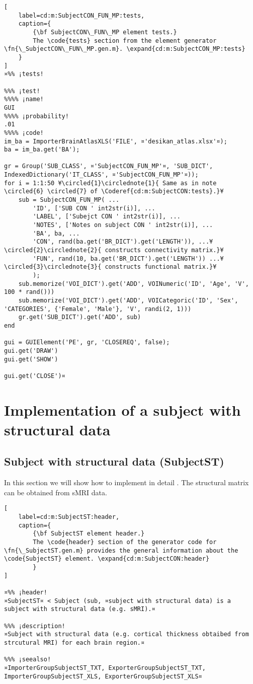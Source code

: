 \documentclass{tufte-handout}
\begin{document}
\begin{lstlisting}[
	label=cd:m:SubjectCON_FUN_MP:tests,
	caption={
		{\bf SubjectCON\_FUN\_MP element tests.}
		The \code{tests} section from the element generator \fn{\_SubjectCON\_FUN\_MP.gen.m}. \expand{cd:m:SubjectCON_MP:tests}
	}
]
¤%% ¡tests!

%%% ¡test!
%%%% ¡name!
GUI
%%%% ¡probability!
.01
%%%% ¡code!
im_ba = ImporterBrainAtlasXLS('FILE', ¤'desikan_atlas.xlsx'¤);
ba = im_ba.get('BA');

gr = Group('SUB_CLASS', ¤'SubjectCON_FUN_MP'¤, 'SUB_DICT', IndexedDictionary('IT_CLASS', ¤'SubjectCON_FUN_MP'¤));
for i = 1:1:50 ¥\circled{1}\circlednote{1}{ Same as in note \circled{6} \circled{7} of \Coderef{cd:m:SubjectCON:tests}.}¥
    sub = SubjectCON_FUN_MP( ...
        'ID', ['SUB CON ' int2str(i)], ...
        'LABEL', ['Subejct CON ' int2str(i)], ...
        'NOTES', ['Notes on subject CON ' int2str(i)], ...
        'BA', ba, ...
        'CON', rand(ba.get('BR_DICT').get('LENGTH')), ...¥\circled{2}\circlednote{2}{ constructs connectivity matrix.}¥
        'FUN', rand(10, ba.get('BR_DICT').get('LENGTH')) ...¥\circled{3}\circlednote{3}{ constructs functional matrix.}¥
        );
    sub.memorize('VOI_DICT').get('ADD', VOINumeric('ID', 'Age', 'V', 100 * rand()))
    sub.memorize('VOI_DICT').get('ADD', VOICategoric('ID', 'Sex', 'CATEGORIES', {'Female', 'Male'}, 'V', randi(2, 1)))
    gr.get('SUB_DICT').get('ADD', sub)
end

gui = GUIElement('PE', gr, 'CLOSEREQ', false);
gui.get('DRAW')
gui.get('SHOW')

gui.get('CLOSE')¤
\end{lstlisting}

\clearpage

\section{Implementation of a subject with structural data}

\subsection{Subject with structural data (SubjectST)}

In this section we will show how to implement in detail . The structural matrix can be obtained from sMRI data.

\begin{lstlisting}[
	label=cd:m:SubjectST:header,
	caption={
		{\bf SubjectST element header.}
		The \code{header} section of the generator code for \fn{\_SubjectST.gen.m} provides the general information about the \code{SubjectST} element. \expand{cd:m:SubjectCON:header}
		}
]

¤%% ¡header!
¤SubjectST¤ < Subject (sub, ¤subject with structural data) is a subject with structural data (e.g. sMRI).¤

%%% ¡description!
¤Subject with structural data (e.g. cortical thickness obtaibed from strcutural MRI) for each brain region.¤

%%% ¡seealso!
¤ImporterGroupSubjectST_TXT, ExporterGroupSubjectST_TXT, ImporterGroupSubjectST_XLS, ExporterGroupSubjectST_XLS¤
\end{lstlisting}
\end{document}
